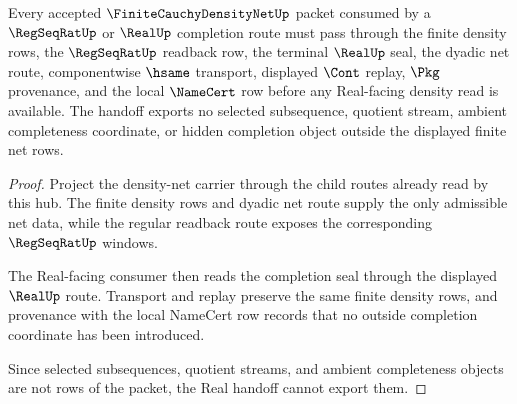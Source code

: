 \begin{theorem}
\label{thm:finite-cauchy-density-net-real-handoff}
Every accepted $\FiniteCauchyDensityNetUp$ packet consumed by a $\RegSeqRatUp$ or $\RealUp$ completion route must pass through the finite density rows, the $\RegSeqRatUp$ readback row, the terminal $\RealUp$ seal, the dyadic net route, componentwise $\hsame$ transport, displayed $\Cont$ replay, $\Pkg$ provenance, and the local $\NameCert$ row before any Real-facing density read is available. The handoff exports no selected subsequence, quotient stream, ambient completeness coordinate, or hidden completion object outside the displayed finite net rows.
\end{theorem}
\begin{proof}
Project the density-net carrier through the child routes already read by this hub. The finite density rows and dyadic net route supply the only admissible net data, while the regular readback route exposes the corresponding $\RegSeqRatUp$ windows.

The Real-facing consumer then reads the completion seal through the displayed $\RealUp$ route. Transport and replay preserve the same finite density rows, and provenance with the local NameCert row records that no outside completion coordinate has been introduced.

Since selected subsequences, quotient streams, and ambient completeness objects are not rows of the packet, the Real handoff cannot export them.
\end{proof}
